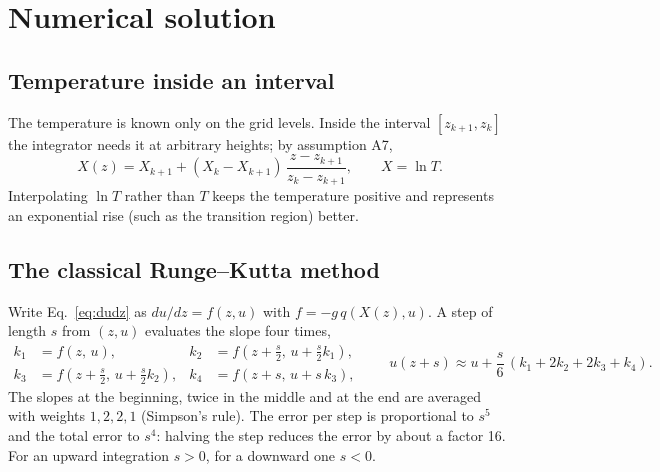 \section{Numerical solution}\label{sec:num}
\subsection{Temperature inside an interval}
The temperature is known only on the grid levels. Inside the interval $[z_{k+1},z_k]$ the integrator needs it at
arbitrary heights; by assumption A7,
\begin{equation}
X(z)=X_{k+1}+(X_k-X_{k+1})\,\frac{z-z_{k+1}}{z_k-z_{k+1}},\qquad X=\ln T .
\end{equation}
Interpolating $\ln T$ rather than $T$ keeps the temperature positive and represents an exponential rise (such as the
transition region) better.

\subsection{The classical Runge--Kutta method}
Write Eq.~\eqref{eq:dudz} as $du/dz=f(z,u)$ with $f=-g\,q(X(z),u)$. A step of length $s$ from $(z,u)$ evaluates the slope
four times,
\begin{equation}
\begin{aligned}
k_1&=f(z,\,u), & k_2&=f\!\left(z+\tfrac{s}{2},\,u+\tfrac{s}{2}k_1\right),\\
k_3&=f\!\left(z+\tfrac{s}{2},\,u+\tfrac{s}{2}k_2\right), & k_4&=f(z+s,\,u+s\,k_3),
\end{aligned}
\qquad
u(z+s)\approx u+\frac{s}{6}\,(k_1+2k_2+2k_3+k_4).\label{eq:rk4}
\end{equation}
The slopes at the beginning, twice in the middle and at the end are averaged with weights $1,2,2,1$ (Simpson's rule). The
error per step is proportional to $s^5$ and the total error to $s^4$: halving the step reduces the error by about a factor 16.
For an upward integration $s>0$, for a downward one $s<0$.

